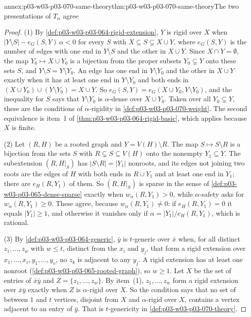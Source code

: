 \begin{annexitem}{annex:p03-w03-p03-070-same-theory}{thm:p03-w03-p03-070-same-theory}{The two presentations of \(T_\alpha\) agree}
\begin{proof}
(1) By \cref{def:p03-w03-p03-064-rigid-extension}, \(Y\) is rigid over \(X\)
when \(|Y\setminus S|-e_G(S,Y)\,\alpha<0\) for every \(S\) with
\(X\subseteq S\subsetneq X\cup Y\), where \(e_G(S,Y)\) is the number of edges
with one end in \(Y\setminus S\) and the other in \(X\cup Y\).  Since
\(X\cap Y=\emptyset\), the map \(Y_0\mapsto X\cup Y_0\) is a bijection from
the proper subsets \(Y_0\subsetneq Y\) onto these sets \(S\), and
\(Y\setminus S=Y\setminus Y_0\).  An edge has one end in \(Y\setminus Y_0\)
and the other in \(X\cup Y\) exactly when it has at least one end in
\(Y\setminus Y_0\) and both ends in \((X\cup Y_0)\cup(Y\setminus Y_0)=X\cup Y\).
So \(e_G(S,Y)=e_G(X\cup Y_0,Y\setminus Y_0)\), and the inequality for \(S\)
says that \(Y\setminus Y_0\) is \(\alpha\)-dense over \(X\cup Y_0\).  Taken
over all \(Y_0\subsetneq Y\), these are the conditions of \(\alpha\)-rigidity
in \cref{def:p03-w03-p03-070-weight}.  The second equivalence is item~1 of
\cref{thm:p03-w03-p03-064-rigid-basic}, which applies because \(X\) is
finite.

(2) Let \((R,H)\) be a rooted graph and \(Y=V(H)\setminus R\).  The map
\(S\mapsto S\setminus R\) is a bijection from the sets \(S\) with
\(R\subsetneq S\subseteq V(H)\) onto the nonempty \(Y_1\subseteq Y\).  The
subextension \((R,H|_S)\) has \(|S\setminus R|=|Y_1|\) nonroots, and its edges
not joining two roots are the edges of \(H\) with both ends in \(R\cup Y_1\)
and at least one end in \(Y_1\); there are \(e_H(R,Y_1)\) of them.  So
\((R,H|_S)\) is sparse in the sense of
\cref{def:p03-w03-p03-065-dense-sparse} exactly when
\(w_\alpha(R,Y_1)>0\), while \(\alpha\)-safety asks for
\(w_\alpha(R,Y_1)\geq0\).  These agree, because \(w_\alpha(R,Y_1)\neq0\): if
\(e_H(R,Y_1)=0\) it equals \(|Y_1|\geq1\), and otherwise it vanishes only if
\(\alpha=|Y_1|/e_H(R,Y_1)\), which is rational.

(3) By \cref{def:p03-w03-p03-064-generic}, \(\bar y\) is \(t\)-generic over
\(\bar x\) when, for all distinct \(z_1,\ldots,z_w\) with \(w\leq t\),
distinct from the \(x_i\) and \(y_j\), that form a rigid extension over
\(x_1,\ldots,x_r,y_1,\ldots,y_v\), no \(z_k\) is adjacent to any \(y_j\).  A
rigid extension has at least one nonroot (\cref{def:p03-w03-p03-065-rooted-graph}),
so \(w\geq1\).  Let \(X\) be the set of entries of \(\bar x\bar y\) and
\(Z=\{z_1,\ldots,z_w\}\).  By item~(1), \(z_1,\ldots,z_w\) form a rigid
extension over \(\bar x\bar y\) exactly when \(Z\) is \(\alpha\)-rigid over
\(X\).  So the condition says that no set of between \(1\) and \(t\)
vertices, disjoint from \(X\) and \(\alpha\)-rigid over \(X\), contains a
vertex adjacent to an entry of \(\bar y\).  That is \(t\)-genericity in
\cref{def:p03-w03-p03-070-theory}.


\end{proof}
\end{annexitem}
